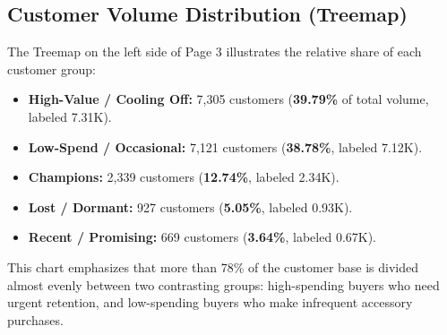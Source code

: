 \begin{table}[htbp]
\centering
\caption{Customer RFM Cluster Statistics.}
\label{tab:rfm_matrix}
\small
\setlength{\tabcolsep}{4.5pt}
\end{table}

\subsection{Customer Volume Distribution (Treemap)}
\label{subsec:bi_page3_volume}
The Treemap on the left side of Page 3 illustrates the relative share of each customer group:
\begin{itemize}
    \item \textbf{High-Value / Cooling Off:} 7,305 customers (\textbf{39.79\%} of total volume, labeled 7.31K).
    \item \textbf{Low-Spend / Occasional:} 7,121 customers (\textbf{38.78\%}, labeled 7.12K).
    \item \textbf{Champions:} 2,339 customers (\textbf{12.74\%}, labeled 2.34K).
    \item \textbf{Lost / Dormant:} 927 customers (\textbf{5.05\%}, labeled 0.93K).
    \item \textbf{Recent / Promising:} 669 customers (\textbf{3.64\%}, labeled 0.67K).
\end{itemize}
This chart emphasizes that more than 78\% of the customer base is divided almost evenly between two contrasting groups: high-spending buyers who need urgent retention, and low-spending buyers who make infrequent accessory purchases.

